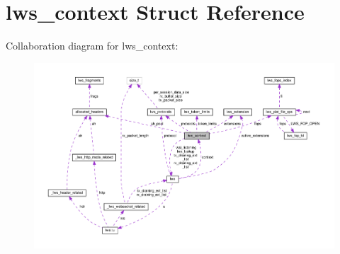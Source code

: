 \hypertarget{structlws__context}{}\section{lws\+\_\+context Struct Reference}
\label{structlws__context}


Collaboration diagram for lws\+\_\+context\+:
\nopagebreak
\begin{figure}[H]
\begin{center}
\leavevmode
\includegraphics[width=350pt]{structlws__context__coll__graph}
\end{center}
\end{figure}

